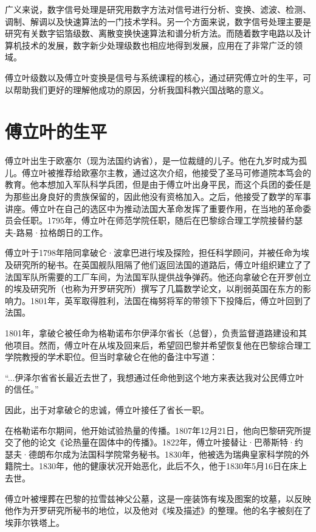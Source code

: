 \documentclass{../source/Paper}
\date{\today}
\begin{document}
    \makeheader

    广义来说，数字信号处理是研究用数字方法对信号进行分析、变换、滤波、检测、调制、解调以及快速算法的一门技术学科。另一个方面来说，数字信号处理主要是研究有关数字铝箔级数、离散变换快速算法和谱分析方法。而随着数字电路以及计算机技术的发展，数字新少处理级数也相应地得到发展，应用在了非常广泛的领域。

    傅立叶级数以及傅立叶变换是信号与系统课程的核心，通过研究傅立叶的生平，可以帮助我们更好的理解他成功的原因，分析我国科教兴国战略的意义。

    \section{傅立叶的生平}

    傅立叶出生于欧塞尔（现为法国约讷省），是一位裁缝的儿子。他在九岁时成为孤儿。傅立叶被推荐给欧塞尔主教，通过这次介绍，他接受了圣马可修道院本笃会的教育。他本想加入军队科学兵团，但是由于傅立叶出身平民，而这个兵团的委任是为那些出身良好的贵族保留的，因此他没有资格加入。之后，他接受了数学的军事讲座。傅立叶在自己的选区中为推动法国大革命发挥了重要作用，在当地的革命委员会任职。1795年，傅立叶在师范学院任职，随后在巴黎综合理工学院接替约瑟夫-路易·拉格朗日的工作。

    傅立叶于1798年陪同拿破仑·波拿巴进行埃及探险，担任科学顾问，并被任命为埃及研究所的秘书。在英国舰队阻隔了他们返回法国的道路后，傅立叶组织建立了了法国军队所需要的工厂车间，为法国军队提供战争弹药。他还向拿破仑在开罗创立的埃及研究所（也称为开罗研究所）撰写了几篇数学论文，以削弱英国在东方的影响力。1801年，英军取得胜利，法国在梅努将军的带领下下投降后，傅立叶回到了法国。

    1801年，拿破仑被任命为格勒诺布尔伊泽尔省长（总督），负责监督道路建设和其他项目。然而，傅立叶在从埃及回来后，希望回巴黎并希望恢复他在巴黎综合理工学院教授的学术职位。但当时拿破仑在他的备注中写道：

    “...伊泽尔省省长最近去世了，我想通过任命他到这个地方来表达我对公民傅立叶的信任。”

    因此，出于对拿破仑的忠诚，傅立叶接任了省长一职。

    在格勒诺布尔期间，他开始试验热量的传播。1807年12月21日，他向巴黎研究所提交了他的论文《论热量在固体中的传播》。1822年，傅立叶接替让·巴蒂斯特·约瑟夫·德朗布尔成为法国科学院常务秘书。1830年，他被选为瑞典皇家科学院的外籍院士。1830年，他的健康状况开始恶化，此后不久，他于1830年5月16日在床上去世。

    傅立叶被埋葬在巴黎的拉雪兹神父公墓，这是一座装饰有埃及图案的坟墓，以反映他作为开罗研究所秘书的地位，以及他对《埃及描述》的整理。他的名字被刻在了埃菲尔铁塔上。
\end{document}
